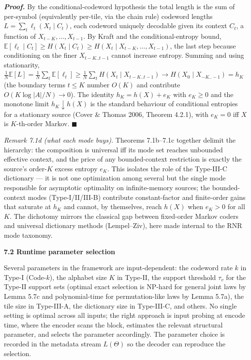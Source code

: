 \documentclass[
]{article}
\begin{document}
\emph{\textbf{Proof.}} By the conditional-codeword hypothesis the total
length is the sum of per-symbol (equivalently per-tile, via the
chain rule) codeword lengths $L = \sum_t \ell_t(X_t \mid C_t)$, each
codeword uniquely decodable given its context $C_t$, a function of
$X_{t-K},\ldots,X_{t-1}$. By Kraft and the conditional-entropy bound,
$\mathbb{E}[\ell_t \mid C_t] \ge H(X_t \mid C_t) \ge H(X_t \mid X_{t-K},
\ldots,X_{t-1})$, the last step because conditioning on the finer
$X_{t-K..t-1}$ cannot increase entropy. Summing and using stationarity,
$\tfrac1N \mathbb{E}[L] = \tfrac1N \sum_t \mathbb{E}[\ell_t] \ge
\tfrac1N \sum_t H(X_t \mid X_{t-K..t-1}) \to
H(X_0 \mid X_{-K..-1}) = h_K$ (the boundary terms $t \le K$ number $O(K)$
and contribute $O(K \log|A| / N) \to 0$). The identity $h_K = h(X) + e_K$
with $e_K \ge 0$ and the monotone limit $h_K \downarrow h(X)$ is the
standard behaviour of conditional entropies for a stationary source
(Cover \& Thomas 2006, Theorem 4.2.1), with $e_K = 0$ iff $X$ is
$K$-th-order Markov. \hfill$\blacksquare$

\emph{Remark 7.1d (what each mode buys).} Theorems 7.1b--7.1c together
delimit the hierarchy: the composition is universal iff its mode set
reaches unbounded effective context, and the price of any bounded-context
restriction is exactly the source's order-$K$ excess entropy $e_K$. This
isolates the role of the Type-III-C dictionary --- it is not one
optimization among several but the single mode responsible for asymptotic
optimality on infinite-memory sources; the bounded-context modes
(Type-I/II/III-B) contribute constant-factor and finite-order gains that
saturate at $h_K$ and cannot, by themselves, reach $h(X)$ when
$e_K > 0$ for all $K$. The dichotomy mirrors the classical gap between
fixed-order Markov coders and universal dictionary methods (Lempel--Ziv),
here made internal to the RNR mode taxonomy.

\textbf{7.2 Runtime parameter selection}

Several parameters in the framework are input-dependent: the codeword
rate $k$ in Type-I (Code-$k$), the alphabet size $K$ in Type-II, the
support threshold $\tau_v$ for the Type-II support sets (optimal
exact selection is NP-hard for general joint laws by Lemma 5.7c and
polynomial-time for permutation-like laws by Lemma 5.7a), the tile size in
Type-III-A, the dictionary size in Type-III-C, and others. No single
setting is optimal across all inputs; the right approach is input
probing at encode time, where the encoder scans the block, estimates
the relevant structural parameter, and selects the parameter
accordingly. The parameter choice is recorded in the metadata stream
$L(\Theta)$ so the decoder can reproduce the selection.
\end{document}
